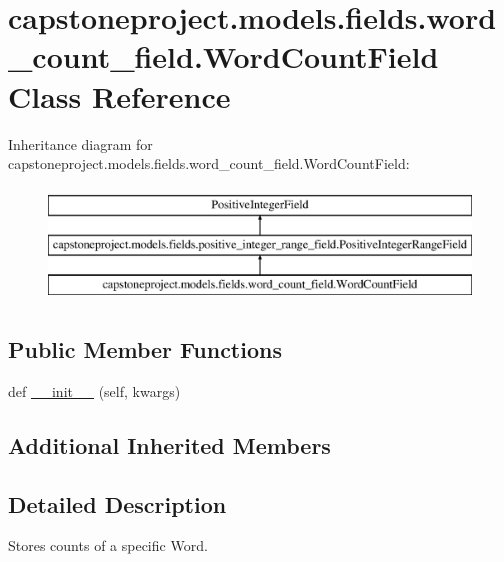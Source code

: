 \hypertarget{classcapstoneproject_1_1models_1_1fields_1_1word__count__field_1_1_word_count_field}{}\section{capstoneproject.\+models.\+fields.\+word\+\_\+count\+\_\+field.\+Word\+Count\+Field Class Reference}
\label{classcapstoneproject_1_1models_1_1fields_1_1word__count__field_1_1_word_count_field}
Inheritance diagram for capstoneproject.\+models.\+fields.\+word\+\_\+count\+\_\+field.\+Word\+Count\+Field\+:\begin{figure}[H]
\begin{center}
\leavevmode
\includegraphics[height=3.000000cm]{classcapstoneproject_1_1models_1_1fields_1_1word__count__field_1_1_word_count_field}
\end{center}
\end{figure}
\subsection*{Public Member Functions}
\begin{DoxyCompactItemize}
\item 
def \mbox{\hyperlink{classcapstoneproject_1_1models_1_1fields_1_1word__count__field_1_1_word_count_field_ac6f8bd2a60ce73f4a214b7a852ab45e0}{\+\_\+\+\_\+init\+\_\+\+\_\+}} (self, kwargs)
\end{DoxyCompactItemize}
\subsection*{Additional Inherited Members}


\subsection{Detailed Description}
\begin{DoxyVerb}Stores counts of a specific Word.\end{DoxyVerb}
 

